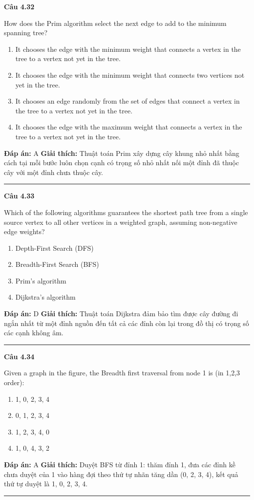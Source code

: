 \documentclass[11pt,a4paper]{article}
\newenvironment{question}[1]{%
  \par\vspace{1em}\noindent\textbf{\large Câu #1}\par\vspace{0.4em}
}{%
  \par\vspace{1em}\hrule\vspace{0.6em}
}
\newenvironment{choices}{%
  \begin{enumerate}[label=\textbf{\Alph*.},leftmargin=2.2em,itemsep=2pt,topsep=3pt]
}{%
  \end{enumerate}
}
\newcommand{\choice}{\item}
\begin{document}
\begin{question}{4.32}
How does the Prim algorithm select the next edge to add to the minimum spanning tree?
\begin{choices}
\choice It chooses the edge with the minimum weight that connects a vertex in the tree to a vertex not yet in the tree.
\choice It chooses the edge with the minimum weight that connects two vertices not yet in the tree.
\choice It chooses an edge randomly from the set of edges that connect a vertex in the tree to a vertex not yet in the tree.
\choice It chooses the edge with the maximum weight that connects a vertex in the tree to a vertex not yet in the tree.
\end{choices}
\textbf{Đáp án:} A
\textbf{Giải thích:} Thuật toán Prim xây dựng cây khung nhỏ nhất bằng cách tại mỗi bước luôn chọn cạnh có trọng số nhỏ nhất nối một đỉnh đã thuộc cây với một đỉnh chưa thuộc cây.
\end{question}

\begin{question}{4.33}
Which of the following algorithms guarantees the shortest path tree from a single source vertex to all other vertices in a weighted graph, assuming non-negative edge weights?
\begin{choices}
\choice Depth-First Search (DFS)
\choice Breadth-First Search (BFS)
\choice Prim's algorithm
\choice Dijkstra's algorithm
\end{choices}
\textbf{Đáp án:} D
\textbf{Giải thích:} Thuật toán Dijkstra đảm bảo tìm được cây đường đi ngắn nhất từ một đỉnh nguồn đến tất cả các đỉnh còn lại trong đồ thị có trọng số các cạnh không âm.
\end{question}

\begin{question}{4.34}
Given a graph in the figure, the Breadth first traversal from node 1 is (in 1,2,3 order):
\begin{center}
\end{center}
\begin{choices}
\choice 1, 0, 2, 3, 4
\choice 0, 1, 2, 3, 4
\choice 1, 2, 3, 4, 0
\choice 1, 0, 4, 3, 2
\end{choices}
\textbf{Đáp án:} A
\textbf{Giải thích:} Duyệt BFS từ đỉnh 1: thăm đỉnh 1, đưa các đỉnh kề chưa duyệt của 1 vào hàng đợi theo thứ tự nhãn tăng dần (0, 2, 3, 4), kết quả thứ tự duyệt là 1, 0, 2, 3, 4.
\end{question}
\end{document}
